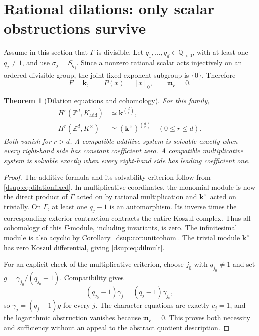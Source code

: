 \documentclass[11pt,oneside]{article}
\numberwithin{equation}{section}
\newtheorem{theorem}{Theorem}[section]
\theoremstyle{definition}
\theoremstyle{remark}
\newcommand{\Q}{\mathbb Q}
\newcommand{\Z}{\mathbb Z}
\newcommand{\kk}{\mathbf k}
\newcommand{\mm}{\mathfrak m}
\begin{document}
\section{Rational dilations: only scalar obstructions survive}\label{dsup:sec:dilations}

Assume in this section that $\Gamma$ is divisible. Let
$q_1,\ldots,q_d\in\Q_{>0}$, with at least one $q_j\ne1$, and use
$\sigma_j=S_{q_j}$. Since a nonzero rational scalar acts injectively on
an ordered divisible group, the joint fixed exponent subgroup is $\{0\}$.
Therefore
\begin{equation}\label{dsup:eq:dilationfixed}
 F=\kk,\qquad P(x)=[x]_0,\qquad\mm_F=0.
\end{equation}

\begin{theorem}[Dilation equations and cohomology]\label{dsup:thm:dilationcohom}
For this family,
\begin{align}
 H^r(\Z^d,K_{\mathrm{add}})&\simeq\kk^{\binom dr},\label{dsup:eq:diladd}\\
 H^r(\Z^d,K^\times)&\simeq(\kk^\times)^{\binom dr}
 \quad(0\le r\le d).\label{dsup:eq:dilmult}
\end{align}
Both vanish for $r>d$. A compatible additive system is solvable exactly
when every right-hand side has constant coefficient zero. A compatible
multiplicative system is solvable exactly when every right-hand side
has leading coefficient one.
\end{theorem}
\begin{proof}
The additive formula and its solvability criterion follow from
\eqref{dsup:eq:dilationfixed}. In multiplicative coordinates, the monomial
module is now the direct product of $\Gamma$ acted on by rational
multiplication and $\kk^\times$ acted on trivially. On $\Gamma$, at least
one $q_j-1$ is an automorphism. Its inverse times the corresponding
exterior contraction contracts the entire Koszul complex. Thus all
cohomology of this $\Gamma$-module, including invariants, is zero.
The infinitesimal module is also acyclic by Corollary~\ref{dsup:cor:unitcohom}.
The trivial module $\kk^\times$ has zero Koszul differential, giving
\eqref{dsup:eq:dilmult}.

For an explicit check of the multiplicative criterion, choose $j_0$ with
$q_{j_0}\ne1$ and set $g=\gamma_{j_0}/(q_{j_0}-1)$. Compatibility gives
\[
 (q_{j_0}-1)\gamma_j=(q_j-1)\gamma_{j_0},
\]
so $\gamma_j=(q_j-1)g$ for every $j$. The character equations are exactly
$c_j=1$, and the logarithmic obstruction vanishes because $\mm_F=0$.
This proves both necessity and sufficiency without an appeal to the
abstract quotient description.
\end{proof}
\end{document}
